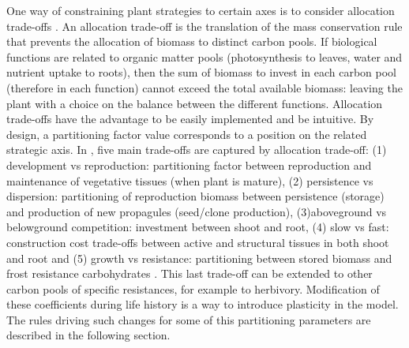 One way of constraining plant strategies to certain axes is to consider allocation trade-offs \parencite{kleidon_global_2000, reineking_environmental_2006}. An allocation trade-off is the translation of the mass conservation rule that prevents the allocation of biomass to distinct carbon pools. If biological functions are related to organic matter pools (photosynthesis to leaves, water and nutrient uptake to roots), then the sum of biomass to invest in each carbon pool (therefore in each function) cannot exceed the total available biomass: leaving the plant with a choice on the balance between the different functions. Allocation trade-offs have the advantage to be easily implemented and be intuitive. By design, a partitioning factor value corresponds to a position on the related strategic axis. In \model, five main trade-offs are captured by allocation trade-off: (1) development vs reproduction: partitioning factor between reproduction and maintenance of vegetative tissues (when plant is mature), (2)  persistence vs dispersion: partitioning of reproduction biomass between persistence (storage) and production of new propagules (seed/clone production), (3)aboveground vs belowground competition: investment between shoot and root, \parencite{kleidon_global_2000, reineking_environmental_2006, taubert_modelling_2014}(4) slow vs fast: construction cost trade-offs between active and structural tissues in both shoot and root and (5) growth vs resistance: partitioning between stored biomass and frost resistance carbohydrates \parencite{cai_changes_2004}. This last trade-off can be extended to other carbon pools of specific resistances, for example to herbivory. Modification of these coefficients during life history is a way to introduce plasticity in the model. The rules driving such changes for some of this partitioning parameters are described in the following section.\\



